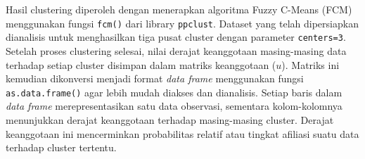 \documentclass[
  oneside]{book}
\begin{document}
Hasil clustering diperoleh dengan menerapkan algoritma Fuzzy C-Means (FCM) menggunakan fungsi \texttt{fcm()} dari library \texttt{ppclust}. Dataset yang telah dipersiapkan dianalisis untuk menghasilkan tiga pusat cluster dengan parameter \texttt{centers=3}. Setelah proses clustering selesai, nilai derajat keanggotaan masing-masing data terhadap setiap cluster disimpan dalam matriks keanggotaan (\(u\)). Matriks ini kemudian dikonversi menjadi format \emph{data frame} menggunakan fungsi \texttt{as.data.frame()} agar lebih mudah diakses dan dianalisis. Setiap baris dalam \emph{data frame} merepresentasikan satu data observasi, sementara kolom-kolomnya menunjukkan derajat keanggotaan terhadap masing-masing cluster. Derajat keanggotaan ini mencerminkan probabilitas relatif atau tingkat afiliasi suatu data terhadap cluster tertentu.
\end{document}
